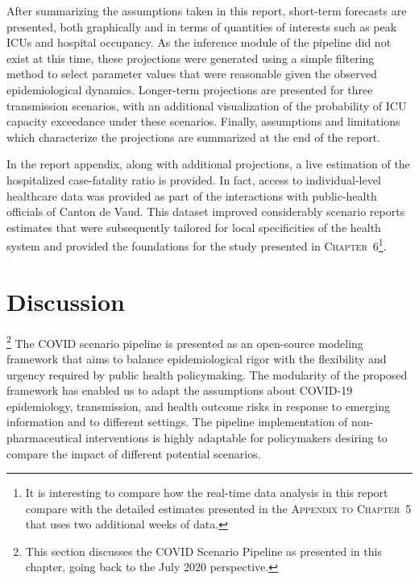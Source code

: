 After summarizing the assumptions taken in this report, short-term forecasts are presented, both graphically and in terms of quantities of interests such as peak ICUs and hospital occupancy. As the inference module of the pipeline did not exist at this time, these projections were generated using a simple filtering method to select parameter values that were reasonable given the observed epidemiological dynamics.  Longer-term projections are presented for three transmission scenarios, with an additional visualization of the probability of ICU capacity exceedance under these scenarios. Finally, assumptions and limitations which characterize the projections are summarized at the end of the report. 

In the report appendix, along with additional projections, a live estimation of the hospitalized case-fatality ratio is provided. In fact, access to individual-level healthcare data was provided as part of the interactions with public-health officials of Canton de Vaud.  This dataset improved considerably scenario reports estimates that were subsequently tailored for local specificities of the health system and provided the foundations for the study presented in \textsc{Chapter~6}\footnote{It is interesting to compare how the real-time data analysis in this report compare with the detailed estimates presented in the \textsc{Appendix to Chapter~5} that uses two additional weeks of data.}.


 


\section{Discussion}\footnote{This section discusses the COVID Scenario Pipeline as presented in this chapter, \ie going back to the July 2020 perspective.}
The COVID scenario pipeline is presented as an open-source modeling framework that aims to balance epidemiological rigor with the flexibility and urgency required by public health policymaking. The modularity of the proposed framework has enabled us to adapt the assumptions about COVID-19 epidemiology, transmission, and health outcome risks in response to emerging information and to different settings. The pipeline implementation of non-pharmaceutical interventions is highly adaptable for policymakers desiring to compare the impact of different potential scenarios.

